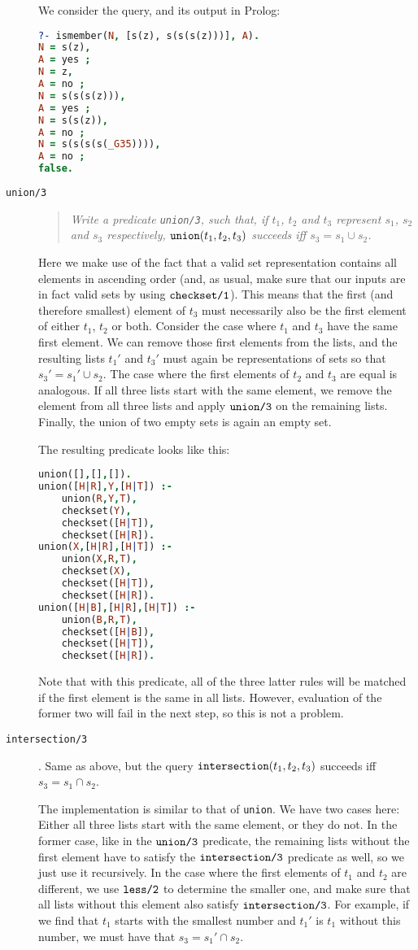 \documentclass[a4paper]{article}
\newcommand{\pfunc}[1]{\textnormal{\texttt{#1}}\xspace}
\newcommand{\pfuncn}[2]{\textnormal{\texttt{#1/#2}}\xspace}
\begin{document}
\begin{description}
  We consider the query, and its output in Prolog:
\begin{lstlisting}[language=prolog]
?- ismember(N, [s(z), s(s(s(z)))], A).
N = s(z),
A = yes ;
N = z,
A = no ;
N = s(s(s(z))),
A = yes ;
N = s(s(z)),
A = no ;
N = s(s(s(s(_G35)))),
A = no ;
false.
\end{lstlisting}
\item[\pfuncn{union}{3}]\hfill
  \begin{quotation}\itshape
    Write a predicate \pfuncn{union}{3}, such that, if $t_1$, $t_2$ and $t_3$ represent $s_1$, $s_2$ and $s_3$ respectively, $\pfunc{union}(t_1, t_2, t_3)$ succeeds iff $s_3 = s_1 \cup s_2$.
  \end{quotation}
  Here we make use of the fact that a valid set representation contains all elements in ascending order (and, as usual, make sure that our inputs are in fact valid sets by using $\pfuncn{checkset}{1}$). This means that the first (and therefore smallest) element of $t_3$ must necessarily also be the first element of either $t_1$, $t_2$ or both. Consider the case where $t_1$ and $t_3$ have the same first element. We can remove those first elements from the lists, and the resulting lists $t_1'$ and $t_3'$ must again be representations of sets so that $s_3' = s_1' \cup s_2$. The case where the first elements of $t_2$ and $t_3$ are equal is analogous. If all three lists start with the same element, we remove the element from all three lists and apply $\pfuncn{union}{3}$ on the remaining lists. Finally, the union of two empty sets is again an empty set. 
  
  The resulting predicate looks like this:
  \begin{lstlisting}[language=prolog]
union([],[],[]).
union([H|R],Y,[H|T]) :- 
	union(R,Y,T),
	checkset(Y), 
	checkset([H|T]),
	checkset([H|R]).
union(X,[H|R],[H|T]) :- 
	union(X,R,T),
	checkset(X), 
	checkset([H|T]),
	checkset([H|R]).
union([H|B],[H|R],[H|T]) :- 
	union(B,R,T),
	checkset([H|B]), 
	checkset([H|T]),
	checkset([H|R]).
\end{lstlisting}

Note that with this predicate, all of the three latter rules will be matched if the first element is the same in all lists. However, evaluation of the former two will fail in the next step, so this is not a problem.
\item[\pfuncn{intersection}{3}]. Same as above, but the query $\pfunc{intersection}(t_1,t_2,t_3)$ succeeds iff $s_3 = s_1 \cap s_2$.

The implementation is similar to that of \texttt{union}. We have two cases here: Either all three lists start with the same element, or they do not. In the former case, like in the $\pfuncn{union}{3}$ predicate, the remaining lists without the first element have to satisfy the $\pfuncn{intersection}{3}$ predicate as well, so we just use it recursively. In the case where the first elements of $t_1$ and $t_2$ are different, we use $\pfuncn{less}{2}$ to determine the smaller one, and make sure that all lists without this element also satisfy $\pfuncn{intersection}{3}$. For example, if we find that $t_1$ starts with the smallest number and $t_1'$ is $t_1$ without this number, we must have that $s_3 = s_1' \cap s_2$. 


\end{description}
\end{document}
